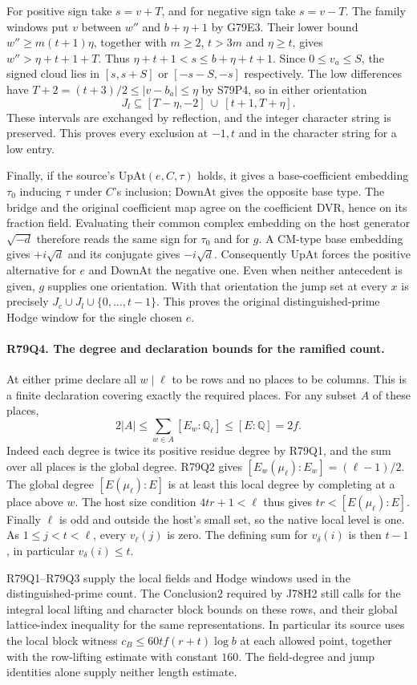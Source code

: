 For positive sign take $s=v+T$, and for negative sign take $s=v-T$.
The family windows put $v$ between $w''$ and $b+\eta+1$
by G79E3. Their lower bound $w''\ge m(t+1)\eta$, together
with $m\ge2$, $t>3m$ and $\eta\ge t$, gives
$w''>\eta+t+1+T$. Thus $\eta+t+1<s\le b+\eta+t+1$.
Since $0\le v_a\le S$, the signed cloud lies in $[s,s+S]$ or
$[-s-S,-s]$ respectively. The low differences have
$T+2=(t+3)/2\le |v-b_a|\le\eta$ by S79P4, so in either
orientation
\[
 J_l\subseteq[T-\eta,-2]\ \cup\ [t+1,T+\eta].
\]
These intervals are exchanged by reflection, and the integer
character string is preserved. This proves every exclusion at
$-1,t$ and in the character string for a low entry.

Finally, if the source's $\mathrm{UpAt}(e,C,\tau)$ holds, it gives
a base-coefficient embedding $\tau_0$ inducing $\tau$ under
$C$'s inclusion; $\mathrm{DownAt}$ gives the opposite base type.
The bridge and the original coefficient map agree on the
coefficient DVR, hence on its fraction field. Evaluating their common
complex embedding on the host generator $\sqrt{-d}$ therefore
reads the same sign for $\tau_0$ and for $g$. A CM-type base
embedding gives $+i\sqrt d$ and its conjugate gives $-i\sqrt d$.
Consequently $\mathrm{UpAt}$ forces the positive alternative
for $e$ and $\mathrm{DownAt}$ the negative one. Even when neither
antecedent is given, $g$ supplies one orientation. With that
orientation the jump set at every $x$ is precisely
$J_c\cup J_l\cup\{0,\ldots,t-1\}$. This proves the original
distinguished-prime Hodge window for the single chosen $e$.

\paragraph{R79Q4. The degree and declaration bounds for the ramified count.}
At either prime declare all $w\mid\ell$ to be rows and no places
to be columns. This is a finite declaration covering exactly the
required places. For any subset $A$ of these places,
\[
 2|A|\le\sum_{w\in A}[E_w:\mathbb Q_\ell]\le
 [E:\mathbb Q]=2f .
\]
Indeed each degree is twice its positive residue degree by R79Q1,
and the sum over all places is the global degree.
R79Q2 gives $[E_w(\mu_\ell):E_w]=(\ell-1)/2$. The global degree
$[E(\mu_\ell):E]$ is at least this local degree by completing at
a place above $w$. The host size condition $4tr+1<\ell$ thus
gives $tr<[E(\mu_\ell):E]$. Finally $\ell$ is odd and outside
the host's small set, so the native local level is one. As
$1\le j<t<\ell$, every $v_\ell(j)$ is zero. The defining sum
for $v_\delta(i)$ is then $t-1$, in particular $v_\delta(i)\le t$.

R79Q1--R79Q3 supply the local fields and Hodge windows used in
the distinguished-prime count. The $\mathrm{Conclusion2}$ required
by J78H2 still calls for the integral local lifting and character
block bounds on these rows, and their global lattice-index
inequality for the same representations. In particular its source
uses the local block witness
$c_B\le60tf(r+t)\log b$ at each allowed point, together with
the row-lifting estimate with constant $160$. The field-degree
and jump identities alone supply neither length estimate.
